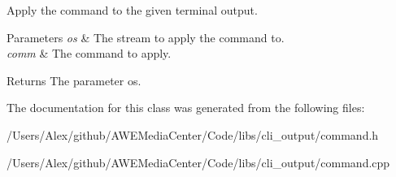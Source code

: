 Apply the command to the given terminal output. 


\begin{DoxyParams}{Parameters}
{\em os} & The stream to apply the command to. \\
\hline
{\em comm} & The command to apply.\\
\hline
\end{DoxyParams}
\begin{DoxyReturn}{Returns}
The parameter {\ttfamily os}. 
\end{DoxyReturn}


The documentation for this class was generated from the following files\-:\begin{DoxyCompactItemize}
\item 
/\-Users/\-Alex/github/\-A\-W\-E\-Media\-Center/\-Code/libs/cli\-\_\-output/command.\-h\item 
/\-Users/\-Alex/github/\-A\-W\-E\-Media\-Center/\-Code/libs/cli\-\_\-output/command.\-cpp\end{DoxyCompactItemize}
